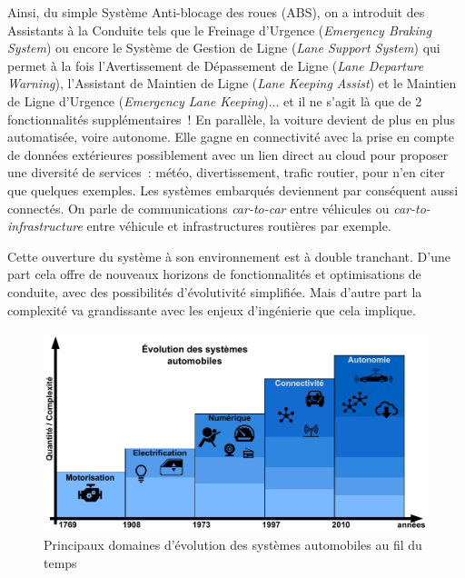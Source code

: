 \documentclass[french, a4paper, 11pt, twoside, pdftex]{StyleThese}
\begin{document}
		Ainsi, du simple Système Anti-blocage des roues (ABS), on a introduit des Assistants à la Conduite tels que le Freinage d'Urgence (\textit{Emergency Braking System}) ou encore le Système de Gestion de Ligne (\textit{Lane Support System}) qui permet à la fois l'Avertissement de Dépassement de Ligne (\textit{Lane Departure Warning}), l'Assistant de Maintien de Ligne (\textit{Lane Keeping Assist}) et le Maintien de Ligne d'Urgence (\textit{Emergency Lane Keeping})... et il ne s'agit là que de 2 fonctionnalités supplémentaires~! En parallèle, la voiture devient de plus en plus automatisée, voire autonome. Elle gagne en connectivité avec la prise en compte de données extérieures possiblement avec un lien direct au cloud pour proposer une diversité de services~: météo, divertissement, trafic routier, pour n'en citer que quelques exemples.
		Les systèmes embarqués deviennent par conséquent aussi connectés. On parle de communications \emph{car-to-car} entre véhicules ou \emph{car-to-infrastructure} entre véhicule et infrastructures routières par exemple.
		
		Cette ouverture du système à son environnement est à double tranchant. D'une part cela offre de nouveaux horizons de fonctionnalités et optimisations de conduite, avec des possibilités d'évolutivité simplifiée. Mais d'autre part la complexité va grandissante avec les enjeux d'ingénierie que cela implique.
		
		\begin{figure}[ht!]
			\centering
			\includegraphics[width=0.9\linewidth]{schemas/Evo_Sys_Automobile}
			\caption[Évolutions des Systèmes Automobiles]{Principaux domaines d'évolution des systèmes automobiles au fil du temps}
			\label{fig:evo_sys_automobile}
		\end{figure}
	
\end{document}
